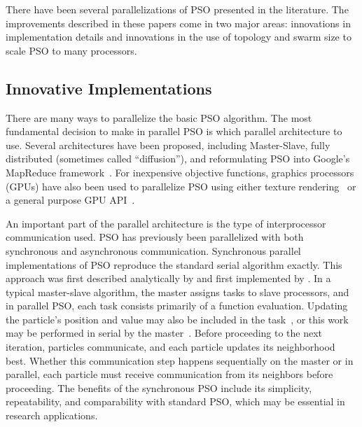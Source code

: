 \documentclass[smallcondensed]{svjour3}
\begin{document}
There have been several parallelizations of PSO presented in the literature.
The improvements described in these papers come in two major areas: innovations
in implementation details and innovations in the use of topology and swarm size
to scale PSO to many processors.

\subsection{Innovative Implementations}

There are many ways to parallelize the basic PSO algorithm.  The most
fundamental decision to make in parallel PSO is which parallel architecture to
use.  Several architectures have been proposed, including Master-Slave, fully
distributed (sometimes called ``diffusion''), and reformulating PSO into
Google's MapReduce framework~\citep{belal-2004-parallel-models-for-pso,
mcnabb-2007-parallel-pso-using-mapreduce}.  For inexpensive objective
functions, graphics processors (GPUs) have also been used to parallelize PSO
using either texture rendering~\citep{li-2007-fine-grained-parallel-pso-gpu} or
a general purpose GPU API~\citep{zhou-2009-gpu-based-parallel-pso}.

An important part of the parallel architecture is the type of interprocessor
communication used.  PSO has previously been parallelized with both synchronous
and asynchronous communication.  Synchronous parallel implementations of PSO
reproduce the standard serial algorithm exactly.  This approach was first
described analytically by \citet{belal-2004-parallel-models-for-pso} and first
implemented by \citet{schutte-2004-parallel-global-optimization-with-pso}.  In
a typical master-slave algorithm, the master assigns tasks to slave processors,
and in parallel PSO, each task consists primarily of a function evaluation.
Updating the particle's position and value may also be included in the
task~\citep{belal-2004-parallel-models-for-pso}, or this work may be performed
in serial by the
master~\citep{schutte-2004-parallel-global-optimization-with-pso}.  Before
proceeding to the next iteration, particles communicate, and each particle
updates its neighborhood best.  Whether this communication step happens
sequentially on the master or in parallel, each particle must receive
communication from its neighbors before proceeding.  The benefits of the
synchronous PSO include its simplicity, repeatability, and comparability with
standard PSO, which may be essential in research applications.
\end{document}
